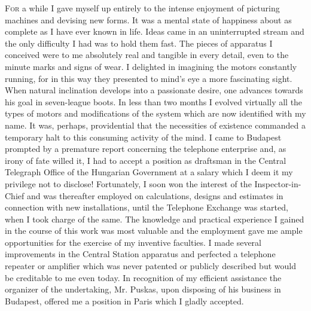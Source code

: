 \documentclass[a4paper,12pt,english,twoside,openright]{memoir}
\begin{document}




\lettrine[lines=3]{F}{or} a while I gave myself up entirely to the intense enjoyment of picturing machines and devising 
new forms.  It was a mental state of happiness about as complete as I have ever known in life.  
Ideas came in an uninterrupted stream and the only difficulty I had was to hold them fast.  The 
pieces of apparatus I conceived were to me absolutely real and tangible in every detail, even to 
the minute marks and signs of wear.  I delighted in imagining the motors constantly running, for in 
this way they presented to mind's eye a more fascinating sight.  When natural inclination 
develops into a passionate desire, one advances towards his goal in seven-league boots.  In less 
than two months I evolved virtually all the types of motors and modifications of the system which 
are now identified with my name.  It was, perhaps, providential that the necessities of existence 
commanded a temporary halt to this consuming activity of the mind.  I came to Budapest 
prompted by a premature report concerning the telephone enterprise and, as irony of fate willed 
it, I had to accept a position as draftsman in the Central Telegraph Office of the Hungarian 
Government at a salary which I deem it my privilege not to disclose! Fortunately, I soon won the 
interest of the Inspector-in-Chief and was thereafter employed on calculations, designs and 
estimates in connection with new installations, until the Telephone Exchange was started, when I 
took charge of the same.  The knowledge and practical experience I gained in the course of this 
work was most valuable and the employment gave me ample opportunities for the exercise of my 
inventive faculties.  I made several improvements in the Central Station apparatus and perfected 
a telephone repeater or amplifier which was never patented or publicly described but would be 
creditable to me even today.  In recognition of my efficient assistance the organizer of the 
undertaking, Mr. Puskas, upon disposing of his business in Budapest, offered me a position in 
Paris which I gladly accepted.  
\end{document}

